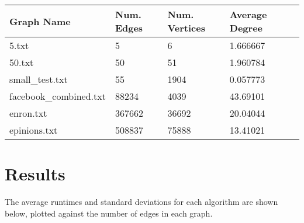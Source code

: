 \documentclass[12pt]{article}
\begin{document}
\begin{tabular}{|l|l|l|l|l}
\cline{1-4}
\hline
Graph Name          & Num. Edges  & Num. Vertices & Average Degree \\
\hline
5.txt                  & 5      & 6        & 1.666667        \\
\hline
50.txt                 & 50     & 51       & 1.960784        \\
\hline
small\_test.txt        & 55     & 1904     & 0.057773        \\
\hline
facebook\_combined.txt & 88234  & 4039     & 43.69101        \\
\hline
enron.txt              & 367662 & 36692    & 20.04044        \\
\hline
epinions.txt           & 508837 & 75888    & 13.41021        \\
\hline
\end{tabular}

\section{Results}

The average runtimes and standard deviations for each algorithm are shown below, plotted against the number of edges in each graph.
\end{document}
